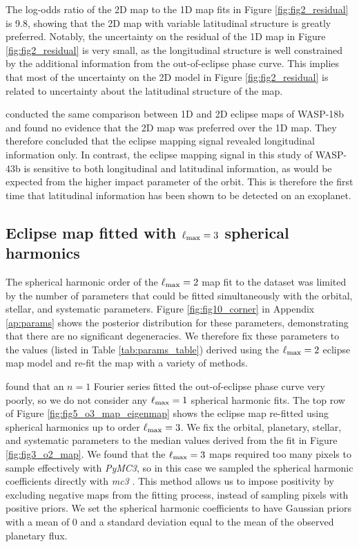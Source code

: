 \documentclass[twocolumn]{aastex631}
\begin{document}
The log-odds ratio of the 2D map to the 1D map fits in Figure \ref{fig:fig2_residual} is 9.8, showing that the 2D map with variable latitudinal structure is greatly preferred.  Notably, the uncertainty on the residual of the 1D map in Figure \ref{fig:fig2_residual} is very small, as the longitudinal structure is well constrained by the additional information from the out-of-eclipse phase curve. This implies that most of the uncertainty on the 2D model in Figure \ref{fig:fig2_residual} is related to uncertainty about the latitudinal structure of the map.

\citet{coulombe2023wasp18b} conducted the same comparison between 1D and 2D eclipse maps of WASP-18b and found no evidence that the 2D map was preferred over the 1D map. They therefore concluded that the eclipse mapping signal revealed longitudinal information only. In contrast, the eclipse mapping signal in this study of WASP-43b is sensitive to both longitudinal and latitudinal information, as would be expected from the higher impact parameter of the orbit. This is therefore the first time that latitudinal information has been shown to be detected on an exoplanet.


\subsection{Eclipse map fitted with $\ell_{\rm max}=3$ spherical harmonics}\label{sec:results:map_o3}

The spherical harmonic order of the $\ell_{\rm max}=2$ map fit to the dataset was limited by the number of parameters that could be fitted simultaneously with the orbital, stellar, and systematic parameters. Figure \ref{fig:fig10_corner} in Appendix \ref{ap:params} shows the posterior distribution for these parameters, demonstrating that there are no significant degeneracies. We therefore fix these parameters to the values (listed in Table \ref{tab:params_table}) derived using the $\ell_{\rm max}=2$ eclipse map model and re-fit the map with a variety of methods.

\citet{bell2023wasp43b} found that an $n=1$ Fourier series fitted the out-of-eclipse phase curve very poorly, so we do not consider any $\ell_{\rm max}=1$ spherical harmonic fits. The top row of Figure \ref{fig:fig5_o3_map_eigenmap} shows the eclipse map re-fitted using spherical harmonics up to order $\ell_{\rm max}=3$.  We fix the orbital, planetary, stellar, and systematic parameters to the median values derived from the fit in Figure \ref{fig:fig3_o2_map}. We found that the $\ell_{\rm max}=3$ maps required too many pixels to sample effectively with \textit{PyMC3}, so in this case we sampled the spherical harmonic coefficients directly with \textit{mc3} \citep{cubillos2016correlated}. This method allows us to impose positivity by excluding negative maps from the fitting process, instead of sampling pixels with positive priors. We set the spherical harmonic coefficients to have Gaussian priors with a mean of 0 and a standard deviation equal to the mean of the observed planetary flux.
\end{document}
